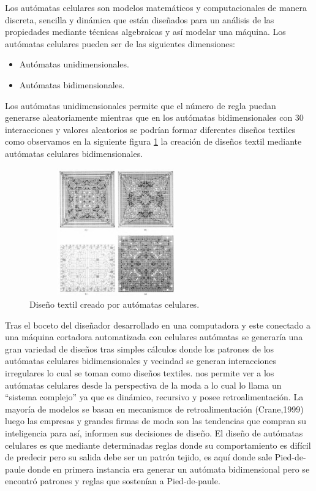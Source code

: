 \documentclass[10pt,conference]{IEEEtran}
\begin{document}
Los autómatas celulares son modelos matemáticos y computacionales de manera discreta, sencilla y dinámica que están diseñados para un análisis de las propiedades mediante técnicas algebraicas y así modelar una máquina.
Los autómatas celulares pueden ser de las siguientes dimensiones: 
\begin{itemize}
\item Autómatas unidimensionales.
\item Autómatas bidimensionales.
\end{itemize}
Los autómatas unidimensionales permite que el número de regla puedan generarse aleatoriamente mientras que en los autómatas bidimensionales con 30 interacciones y valores aleatorios se podrían formar diferentes diseños textiles como observamos en la siguiente figura \ref{Textil1} la creación de diseños textil mediante autómatas celulares bidimensionales.
 \begin{figure}[H]
    \centering
    \includegraphics[width=7.5cm, height=5.5cm]{Ind. Tetxil/Aut. Textil Bidim..PNG}
    \caption{Diseño textil creado por autómatas celulares.}
    \label{Textil1} 
    \end{figure}
    \vspace{-2.6mm}
Tras el boceto del diseñador desarrollado en una computadora y este conectado a una máquina cortadora automatizada con celulares autómatas se generaría una gran variedad de diseños tras simples cálculos donde los patrones de los autómatas celulares bidimensionales y vecindad se generan interacciones irregulares lo cual se toman como diseños textiles.
 nos permite ver a los autómatas celulares desde la perspectiva de la moda a lo cual lo llama un ``sistema complejo'' ya que es dinámico, recursivo y posee retroalimentación. La mayoría de modelos se basan en mecanismos de retroalimentación (Crane,1999) luego las empresas y grandes firmas de moda son las tendencias que compran su inteligencia para así, informen sus decisiones de diseño.
El diseño de autómatas celulares es que mediante determinadas reglas donde su comportamiento es difícil de predecir pero su salida debe ser un patrón tejido, es aquí donde sale Pied-de-paule donde en primera instancia era generar un autómata bidimensional pero se encontró patrones y reglas que sostenían a Pied-de-paule. 
\end{document}
